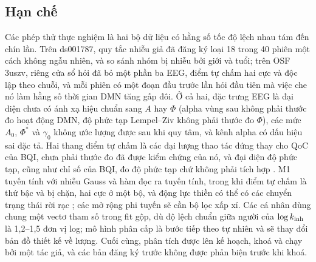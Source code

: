 \subsection{Hạn chế}
\label{sec:limitations}
Các phép thử thực nghiệm là hai bộ dữ liệu có hằng số tốc độ lệch nhau tám đến chín lần. Trên ds001787, quy tắc nhiễu giả đã đăng ký loại 18 trong 40 phiên một cách không ngẫu nhiên, và so sánh nhóm bị nhiễu bởi giới và tuổi; trên OSF 3uszv, riêng cửa sổ hỏi đã bỏ một phần ba EEG, điểm tự chấm hai cực và độc lập theo chuỗi, và mỗi phiên có một đoạn đầu trước lần hỏi đầu tiên mà việc che nó làm hằng số thời gian DMN tăng gấp đôi. Ở cả hai, đặc trưng EEG là đại diện chưa có ánh xạ hiệu chuẩn sang $A$ hay $\Phi$ (alpha vùng sau không phải thước đo hoạt động DMN, độ phức tạp Lempel--Ziv không phải thước đo $\Phi$), các mức $A_0$, $\Phi^*$ và $\gamma_0$ không ước lượng được sau khi quy tâm, và kênh alpha có dấu hiệu sai đặc tả. Hai thang điểm tự chấm là các đại lượng thao tác đứng thay cho QoC của BQI, chưa phải thước đo đã được kiểm chứng của nó, và đại diện độ phức tạp, cũng như chỉ số của BQI, đo độ phức tạp chứ không phải tích hợp \cite[Mục~11.3]{BQI}. M1 tuyến tính với nhiễu Gauss và hàm đọc ra tuyến tính, trong khi điểm tự chấm là thứ bậc và bị chặn, hai cực ở một bộ, và động lực thiền có thể có các chuyển trạng thái rời rạc \cite{Hasenkamp2012,Christoff2016}; các mở rộng phi tuyến sẽ cần bộ lọc xấp xỉ. Các cá nhân dùng chung một vectơ tham số trong fit gộp, dù độ lệch chuẩn giữa người của $\log k_{\mathrm{inh}}$ là 1,2--1,5 đơn vị log; mô hình phân cấp là bước tiếp theo tự nhiên và sẽ thay đổi bản đồ thiết kế về lượng. Cuối cùng, phân tích được lên kế hoạch, khoá và chạy bởi một tác giả, và các bản đăng ký trước không được phản biện trước khi khoá.
